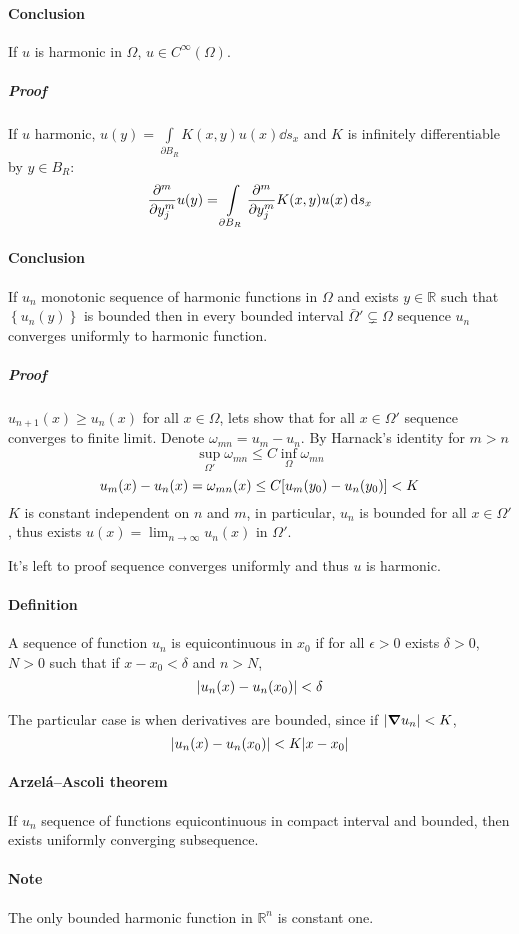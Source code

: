 \paragraph{Conclusion}
If $u$ is harmonic in $\Omega$, $u\in C^\infty(\Omega)$.
\subparagraph{Proof}
If $u$ harmonic, $u(y) = \int\limits_{\partial B_R} K(x,y)u(x) \dd{s_x} $ and $K$ is infinitely differentiable by $y\in B_R$:
$$\pdv[m]{y_j} u(y) = \int\limits_{\partial B_R} \pdv[m]{y_j} K(x,y)u(x) \dd{s_x} $$
\paragraph{Conclusion}
If $u_n$ monotonic sequence of harmonic functions in $\Omega$ and exists $y\in \mathbb{R}$ such that $\left\{ u_n(y)\right\}$ is bounded then in every bounded interval $\bar{\Omega}' \subsetneq \Omega$ sequence $u_n$ converges uniformly to harmonic function.
\subparagraph{Proof}
$u_{n+1}(x) \geq u_n(x)$ for all $x\in \Omega$, lets show that for all $x\in \Omega'$ sequence converges to finite limit. Denote $\omega_{mn} = u_m - u_n$. By Harnack's identity for $m>n$
$$\sup\limits_{\Omega'} \omega_{mn} \leq C \inf\limits_\Omega \omega_{mn}$$
$$u_m(x) - u_n(x) = \omega_{mn}(x) \leq C\qty[u_m(y_0)-u_n(y_0)] < K$$
$K$ is constant independent on $n$ and $m$, in particular, $u_n$ is bounded for all $x\in \Omega'$, thus exists $u(x) = \lim_{n \to \infty} u_n(x)$ in $\Omega'$.

It's left to proof sequence converges uniformly and thus $u$ is harmonic.
\paragraph{Definition} A sequence of function $u_n$ is equicontinuous in $x_0$ if for all $\epsilon>0$ exists $\delta>0$, $N>0$ such that if $x-x_0<\delta$ and $n>N$, 
$$\abs{u_n(x) - u_n(x_0)} < \delta$$

The particular case is when derivatives are bounded, since if $\abs{\grad u_n} < K$,
$$\abs{u_n(x) - u_n(x_0)} < K\abs{x-x_0}$$
\paragraph{Arzel\'{a}–Ascoli theorem }
If $u_n$ sequence of functions equicontinuous  in compact interval and bounded, then exists uniformly converging subsequence.
\paragraph{Note} The only bounded harmonic function in $\mathbb{R}^n$ is constant one.
